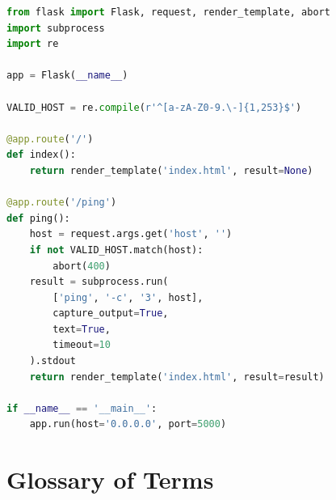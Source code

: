 \begin{lstlisting}[language=Python, caption={app.py (fixed) --- subprocess list form eliminates command injection}]
from flask import Flask, request, render_template, abort
import subprocess
import re

app = Flask(__name__)

VALID_HOST = re.compile(r'^[a-zA-Z0-9.\-]{1,253}$')

@app.route('/')
def index():
    return render_template('index.html', result=None)

@app.route('/ping')
def ping():
    host = request.args.get('host', '')
    if not VALID_HOST.match(host):
        abort(400)
    result = subprocess.run(
        ['ping', '-c', '3', host],
        capture_output=True,
        text=True,
        timeout=10
    ).stdout
    return render_template('index.html', result=result)

if __name__ == '__main__':
    app.run(host='0.0.0.0', port=5000)
\end{lstlisting}


\chapter{Glossary of Terms}

